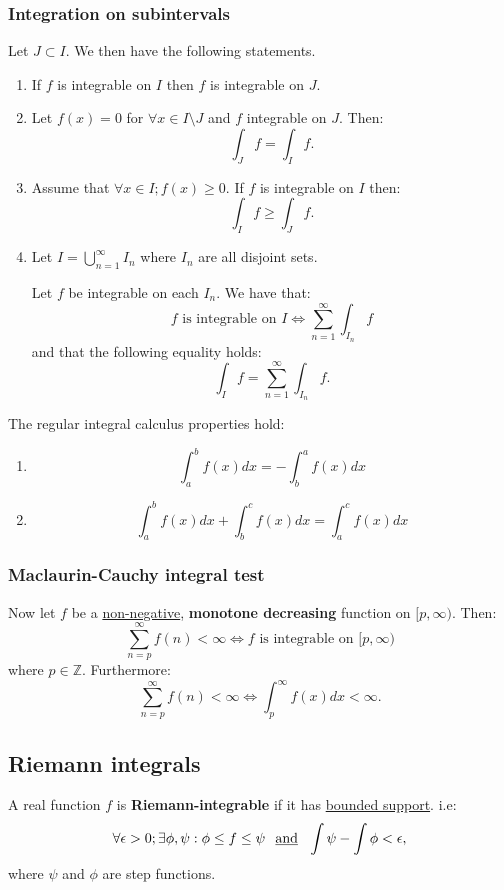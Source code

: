 \documentclass{article}
\begin{document}
\subsubsection{Integration on subintervals}
Let $J\subset I$. We then have the following statements.
\begin{enumerate}
    \item If $f$ is integrable on $I$ then $f$ is integrable on $J$.

    \item Let $f(x)=0$ for $\forall x\in I\setminus J$ and $f$ integrable on $J$. Then:
    $$\int_J f=\int_I f.$$

    \item Assume that $\forall x\in I; f(x)\geq0$. If $f$ is integrable on $I$ then:
    $$\int_I f\geq\int_J f.$$

    \item Let $I=\displaystyle\bigcup_{n=1}^{\infty}I_n$ where $I_n$ are all disjoint sets.
    
    Let $f$ be integrable on each $I_n$. We have that:
    $$\text{$f$ is integrable on $I$}\iff\sum_{n=1}^{\infty}\int_{I_n}f$$
    and that the following equality holds:
    $$\int_I f=\sum_{n=1}^{\infty}\int_{I_n}f.$$
\end{enumerate}
The regular integral calculus properties hold:
\begin{enumerate}
    \item $$\int_{a}^{b}f(x)dx=-\int_{b}^{a}f(x)dx$$

    \item $$\int_{a}^{b}f(x)dx+\int_{b}^{c}f(x)dx=\int_{a}^{c}f(x)dx$$
\end{enumerate}

\subsubsection{Maclaurin-Cauchy integral test}
Now let $f$ be a \underline{non-negative}, \textbf{monotone decreasing} function on $[p,\infty)$. Then:
$$\sum_{n=p}^{\infty}f(n)<\infty\iff\text{$f$ is integrable on $[p,\infty)$}$$
where $p\in\mathbb{Z}$. Furthermore:
$$\sum_{n=p}^{\infty}f(n)<\infty\iff\int_{p}^{\infty}f(x)dx<\infty.$$

\newpage

\subsection{Riemann integrals}
A real function $f$ is \textbf{Riemann-integrable} if it has \underline{bounded support}. i.e:
$$\forall\epsilon>0; \exists\phi,\psi:\phi\leq f\leq\psi\hspace{0.1in}\text{\underline{and}}
\hspace{0.1in}\int\psi-\int\phi<\epsilon,$$
where $\psi$ and $\phi$ are step functions.
\end{document}
